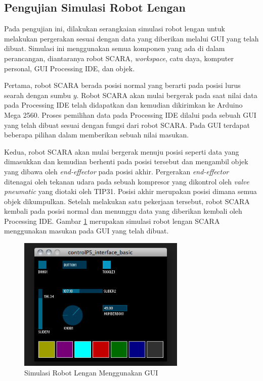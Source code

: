 \subsection{Pengujian Simulasi Robot Lengan}
Pada pengujian ini, dilakukan serangkaian simulasi robot lengan untuk melakukan pergerakan sesuai dengan data yang diberikan melalui GUI yang telah dibuat. Simulasi ini menggunakan semua komponen yang ada di dalam perancangan, diantaranya robot SCARA, \textit{workspace}, catu daya, komputer personal, GUI Processing IDE, dan objek.

Pertama, robot SCARA berada posisi normal yang berarti pada posisi lurus searah dengan sumbu $y$. Robot SCARA akan mulai bergerak pada saat nilai data pada Processing IDE telah didapatkan dan kemudian dikirimkan ke Arduino Mega 2560. Proses pemilihan data pada Processing IDE dilalui pada sebuah GUI yang telah dibuat sesuai dengan fungsi dari robot SCARA. Pada GUI terdapat beberapa pilihan dalam memberikan sebuah nilai masukan. 

Kedua, robot SCARA akan mulai bergerak menuju posisi seperti data yang dimasukkan dan kemudian berhenti pada posisi tersebut dan mengambil objek yang dibawa oleh \textit{end-effector} pada posisi akhir.  Pergerakan \textit{end-effector} ditenagai oleh tekanan udara pada sebuah kompresor yang dikontrol oleh\textit{ valve pneumatic} yang diotaki oleh TIP31. Posisi akhir merupakan posisi dimana semua objek dikumpulkan. Setelah melakukan satu pekerjaan tersebut, robot SCARA kembali pada posisi normal dan menunggu data yang diberikan kembali oleh Processing IDE.  Gambar \ref{pic.simulasiakhir} merupakan simulasi robot lengan SCARA menggunakan masukan pada GUI yang telah dibuat.
 \begin{figure}[H]
 	\centering
 	\includegraphics[width=8cm]{gambar/controlp5.jpg}
 	\caption{Simulasi Robot Lengan Menggunakan GUI }
 	\label{pic.simulasiakhir}
 \end{figure}




